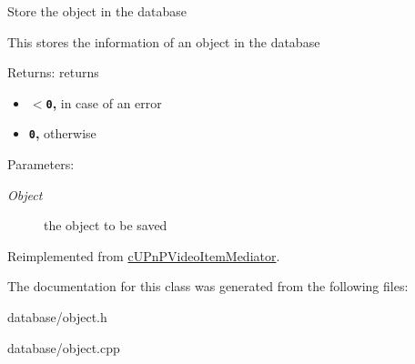 Store the object in the database

This stores the information of an object in the database

\begin{Desc}
\item[Returns:]returns\begin{itemize}
\item {\bf {\tt $<$0},} in case of an error\item {\bf {\tt 0},} otherwise \end{itemize}
\end{Desc}
\begin{Desc}
\item[Parameters:]
\begin{description}
\item[{\em Object}]the object to be saved \end{description}
\end{Desc}
 

Reimplemented from \hyperlink{classcUPnPVideoItemMediator_984e10738bca46ce38307d5f60e26bd3}{cUPnPVideoItemMediator}.

The documentation for this class was generated from the following files:\begin{CompactItemize}
\item 
database/object.h\item 
database/object.cpp\end{CompactItemize}

